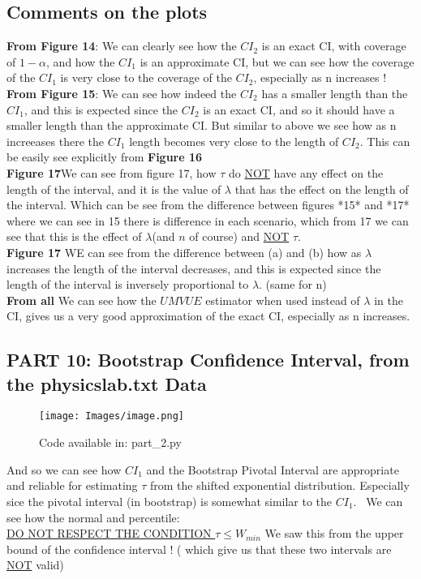 \documentclass[12pt]{article}
\begin{document}
\subsection*{Comments on the plots}
\textbf{From Figure 14}: We can clearly see how the $CI_2$ is an exact CI, with coverage of $1-\alpha$, and how the $CI_1$ is an approximate CI, but we can see how the coverage of the $CI_1$ is very close to the coverage of the $CI_2$, especially as n increases ! \\
\textbf{From Figure 15}: We can see how indeed the $CI_2$ has a smaller length than the $CI_1$, and this is expected since the $CI_2$ is an exact CI, and so it should have a smaller length than the approximate CI. But similar to above we see how as n increeases there the $CI_1$ length becomes very close to the length of $CI_2$. This can be easily see explicitly from \textbf{Figure 16} \\
\textbf{Figure 17}We can see from figure 17, how $\tau$ do \underline{NOT} have any effect on the length of the interval, and it is the value of $\lambda$ that has the effect on the length of the interval. Which can be see from the difference between figures *15* and *17* where we can see in 15 there is difference in each scenario, which from 17 we can see that this is the effect of $\lambda$(and $n$ of course) and \underline{NOT} $\tau$.\\
\textbf{Figure 17} WE can see from the difference between (a) and (b) how as $\lambda$ increases the length of the interval decreases, and this is expected since the length of the interval is inversely proportional to $\lambda$. (same for n)\\
\textbf{From all} We can see how the $UMVUE$ estimator when used instead of $\lambda$ in the CI, gives us a very good approximation of the exact CI, especially as n increases. 

\subsection*{PART 10: Bootstrap Confidence Interval, from the physicslab.txt Data}
\begin{figure}[H]
  \centering
  \texttt{[image: Images/image.png]}
  \caption{Code available in: part\_2.py}
\end{figure}
And so we can see how $CI_1$ and the Bootstrap Pivotal Interval are appropriate and reliable for estimating $\tau$ from the shifted exponential distribution.  Especially sice the pivotal interval  (in bootstrap) is somewhat similar to the $CI_1$. \ 
We can see how the normal and percentile: \\ \underline{DO NOT RESPECT THE CONDITION $\tau \leq W_{min}$} We saw this from the upper bound of the confidence interval ! ( which give us that these two intervals are \underline{NOT} valid)
\end{document}
